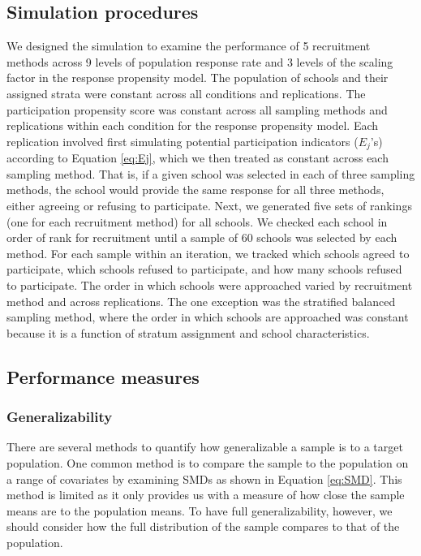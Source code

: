 \documentclass[
  english,
  man,floatsintext]{apa6}
\begin{document}
\hypertarget{simulation-procedures}{%
\subsection{Simulation procedures}\label{simulation-procedures}}

We designed the simulation to examine the performance of 5 recruitment methods across 9 levels of population response rate and 3 levels of the scaling factor in the response propensity model. The population of schools and their assigned strata were constant across all conditions and replications. The participation propensity score was constant across all sampling methods and replications within each condition for the response propensity model. Each replication involved first simulating potential participation indicators (\(E_j\)'s) according to Equation \eqref{eq:Ej}, which we then treated as constant across each sampling method. That is, if a given school was selected in each of three sampling methods, the school would provide the same response for all three methods, either agreeing or refusing to participate. Next, we generated five sets of rankings (one for each recruitment method) for all schools.
We checked each school in order of rank for recruitment until a sample of 60 schools was selected by each method. For each sample within an iteration, we tracked which schools agreed to participate, which schools refused to participate, and how many schools refused to participate.
The order in which schools were approached varied by recruitment method and across replications. The one exception was the stratified balanced sampling method, where the order in which schools are approached was constant because it is a function of stratum assignment and school characteristics.

\hypertarget{performance-measures}{%
\subsection{Performance measures}\label{performance-measures}}

\hypertarget{generalizability}{%
\subsubsection{Generalizability}\label{generalizability}}

There are several methods to quantify how generalizable a sample is to a target population. One common method is to compare the sample to the population on a range of covariates by examining SMDs as shown in Equation \eqref{eq:SMD}. This method is limited as it only provides us with a measure of how close the sample means are to the population means.
To have full generalizability, however, we should consider how the full distribution of the sample compares to that of the population.
\end{document}
